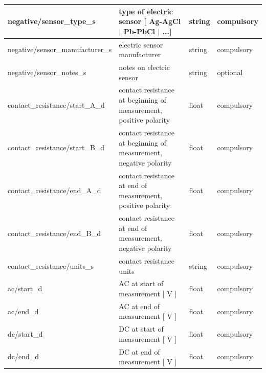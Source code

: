 \documentclass{article}
\begin{document}
\begin{table}[htb!]
\begin{tabular}{|l|p{3in}|l|l|}
		negative/sensor\_type\_s & type of electric sensor [ Ag-AgCl $|$ Pb-PbCl $|$ ...] & string & compulsory \\ \hline
		negative/sensor\_manufacturer\_s & electric sensor manufacturer & string & compulsory \\ \hline
		negative/sensor\_notes\_s & notes on electric sensor & string & optional \\ \hline
		contact\_resistance/start\_A\_d & contact resistance at beginning of measurement, positive polarity & float & compulsory \\ \hline
		contact\_resistance/start\_B\_d & contact resistance at beginning of measurement, negative polarity & float & compulsory \\ \hline
		contact\_resistance/end\_A\_d & contact resistance at end of measurement, positive polarity & float & compulsory \\ \hline
		contact\_resistance/end\_B\_d & contact resistance at end of measurement, negative polarity & float & compulsory \\ \hline
		contact\_resistance/units\_s & contact resistance units & string & compulsory \\ \hline
		ac/start\_d & AC at start of measurement [ V ] & float & compulsory \\ \hline
		ac/end\_d & AC at end of measurement [ V ] & float & compulsory \\ \hline
		dc/start\_d & DC at start of measurement [ V ] & float & compulsory \\ \hline
		dc/end\_d & DC at end of measurement [ V ] & float & compulsory \\ \hline
		
	\end{tabular}
	\label{tab:electric01}
\end{table}	
\end{document}
